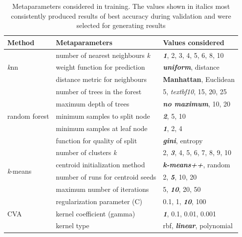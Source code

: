 \documentclass[12pt]{article}
\begin{document}
\begin{table} %
  \small
  \begin{center}
  \vspace{-1.5\baselineskip} %
  \setlength{\abovecaptionskip}{5pt}
  \setlength{\belowcaptionskip}{5pt}
  \fontsize{10}{10}\selectfont %
  \begin{tabular}{l|l|l}
  Method & Metaparameters & Values considered\\
  \hline
  \multirow{3}{*}{\textit{k}nn} & number of nearest neighbours \textit{k}	  & \textit{\textbf{1}}, 2, 3, 4, 5, 6, 8, 10 \\
                            & weight function for prediction	& \textit{\textbf{uniform}}, distance \\
                        & distance metric for neighbours	& \textbf{Manhattan}, Euclidean \\
  \hline
  \multirow{5}{*}{random forest} & number of trees in the forest & 5, \textit{textbf{10}}, 15, 20, 25 \\
                                 & maximum depth of trees	         & \textit{\textbf{no maximum}}, 10, 20 \\
                                 & minimum samples to split node	 & \textit{\textbf{2}}, 5, 10 \\
                                 & minimum samples at leaf node    & \textit{\textbf{1}}, 2, 4 \\
                                 & function for quality of split   & \textit{\textbf{gini}}, entropy \\
  \hline
  \multirow{4}{*}{\textit{k}-means} & number of clusters \textit{k}  & 2, \textit{\textbf{3}}, 4, 5, 6, 7, 8, 9, 10 \\
                              & centroid initialization method         & \textit{\textbf{k-means++}}, random \\
                              & number of runs for centroid seeds	     & 2, \textit{\textbf{5}}, 10, 20 \\
                              & maximum number of iterations           & 5, \textit{\textbf{10}}, 20, 50 \\
  \hline
    \multirow{3}{*}{CVA} & regularization parameter (C)  & 0.1, 1, \textit{\textbf{10}}, 100 \\
                          & kernel coefficient (gamma)   & \textit{\textbf{1}}, 0.1, 0.01, 0.001 \\
                          & kernel type                  & rbf, \textit{\textbf{linear}}, polynomial \\
  \hline
  \end{tabular}
  \vspace{-1.5\baselineskip} %
  \end{center} 
  \caption{Metaparameters considered in training. 
  The values shown in italics most consistently produced results of 
  best accuracy during validation and were selected for generating results}
  \vspace{-1\baselineskip} %
  \label{tab:metaparameters}
\end{table} 
\end{document}
